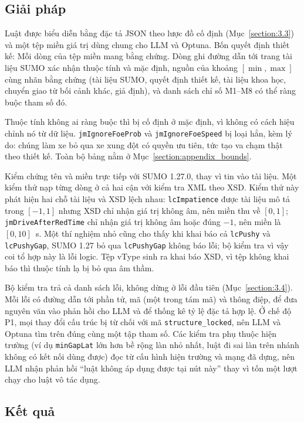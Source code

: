 \documentclass[../main.tex]{subfiles}
\begin{document}
\subsection{Giải pháp}

Luật được biểu diễn bằng đặc tả JSON theo lược đồ cố định (Mục~\ref{section:3.3}) và một tệp miền giá trị dùng chung cho LLM và Optuna. Bốn quyết định thiết kế: Mỗi dòng của tệp miền mang bằng chứng. Dòng ghi đường dẫn tới trang tài liệu SUMO xác nhận thuộc tính và mặc định, nguồn của khoảng $[\min,\max]$ cùng nhãn bằng chứng (tài liệu SUMO, quyết định thiết kế, tài liệu khoa học, chuyển giao từ bối cảnh khác, giả định), và danh sách chỉ số M1--M8 có thể ràng buộc tham số đó.

Thuộc tính không ai ràng buộc thì bị cố định ở mặc định, vì không có cách hiệu chỉnh nó từ dữ liệu. \texttt{jmIgnoreFoeProb} và \texttt{jmIgnoreFoeSpeed} bị loại hẳn, kèm lý do: chúng làm xe bỏ qua xe xung đột có quyền ưu tiên, tức tạo va chạm thật theo thiết kế. Toàn bộ bảng nằm ở Mục~\ref{section:appendix_bounds}.

Kiểm chứng tên và miền trực tiếp với SUMO 1.27.0, thay vì tin vào tài liệu. Một kiểm thử nạp từng dòng ở cả hai cận với kiểm tra XML theo XSD. Kiểm thử này phát hiện hai chỗ tài liệu và XSD lệch nhau: \texttt{lcImpatience} được tài liệu mô tả trong $[-1,1]$ nhưng XSD chỉ nhận giá trị không âm, nên miền thu về $[0,1]$; \texttt{jmDriveAfterRedTime} chỉ nhận giá trị không âm hoặc đúng $-1$, nên miền là $[0,10]$~s. Một thí nghiệm nhỏ cũng cho thấy khi khai báo cả \texttt{lcPushy} và \texttt{lcPushyGap}, SUMO 1.27 bỏ qua \texttt{lcPushyGap} không báo lỗi; bộ kiểm tra vì vậy coi tổ hợp này là lỗi logic. Tệp vType sinh ra khai báo XSD, vì tệp không khai báo thì thuộc tính lạ bị bỏ qua âm thầm.

Bộ kiểm tra trả cả danh sách lỗi, không dừng ở lỗi đầu tiên (Mục~\ref{section:3.4}). Mỗi lỗi có đường dẫn tới phần tử, mã (một trong tám mã) và thông điệp, để đưa nguyên văn vào phản hồi cho LLM và để thống kê tỷ lệ đặc tả hợp lệ. Ở chế độ P1, mọi thay đổi cấu trúc bị từ chối với mã \texttt{structure\_locked}, nên LLM và Optuna tìm trên đúng cùng một tập tham số. Các kiểm tra phụ thuộc hiện trường (ví dụ \texttt{minGapLat} lớn hơn bề rộng làn nhỏ nhất, luật đi sai làn trên nhánh không có kết nối dùng được) đọc từ cấu hình hiện trường và mạng đã dựng, nên LLM nhận phản hồi ``luật không áp dụng được tại nút này'' thay vì tốn một lượt chạy cho luật vô tác dụng.

\subsection{Kết quả}
\end{document}
